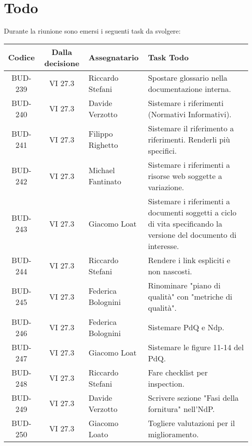 
\section{Todo}

Durante la riunione sono emersi i seguenti task da svolgere:

\vspace{0.5cm}

\begin{table}[htbp]
\centering
{}
\begin{tabular}{|c|c|p{}|p{}|}
    \hline
    \rowcolor[gray]{0.75}
    \textbf{Codice} & \textbf{Dalla decisione} & \textbf{Assegnatario} & \textbf{Task Todo} \\
    \hline
    BUD-239 & VI 27.3 & Riccardo Stefani & Spostare glossario nella documentazione interna. \\
    \hline
    BUD-240 & VI 27.3 & Davide Verzotto & Sistemare i riferimenti (Normativi Informativi). \\
    \hline
    BUD-241 & VI 27.3 & Filippo Righetto & Sistemare il riferimento a riferimenti. Renderli più specifici. \\
    \hline
    BUD-242 & VI 27.3 & Michael Fantinato & Sistemare i riferimenti a risorse web soggette a variazione. \\
    \hline
    BUD-243 & VI 27.3 & Giacomo Loat & Sistemare i riferimenti a documenti soggetti a ciclo di vita specificando la versione del documento di interesse. \\
    \hline
    BUD-244 & VI 27.3 & Riccardo Stefani & Rendere i link espliciti e non nascosti. \\
    \hline
    BUD-245 & VI 27.3 & Federica Bolognini & Rinominare "piano di qualità" con "metriche di qualità". \\
    \hline
    BUD-246 & VI 27.3 & Federica Bolognini & Sistemare PdQ e Ndp. \\
    \hline
    BUD-247 & VI 27.3 & Giacomo Loat & Sistemare le figure 11-14 del PdQ. \\
    \hline
    BUD-248 & VI 27.3 & Riccardo Stefani & Fare checklist per inspection. \\
    \hline
    BUD-249 & VI 27.3 & Davide Verzotto & Scrivere sezione "Fasi della fornitura" nell'NdP. \\
    \hline
    BUD-250 & VI 27.3 & Giacomo Loato & Togliere valutazioni per il miglioramento. \\

\end{tabular}
\end{table}
